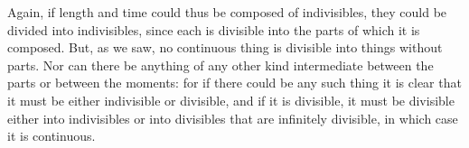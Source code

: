 \documentclass[preview]{standalone}
\begin{document}
\begin{center}
Again, if length and time could thus be composed of indivisibles, they could be divided into indivisibles, since each is divisible into the parts of which it is composed. But, as we saw, no continuous thing is divisible into things without parts. Nor can there be anything of any other kind intermediate between the parts or between the moments: for if there could be any such thing it is clear that it must be either indivisible or divisible, and if it is divisible, it must be divisible either into indivisibles or into divisibles that are infinitely divisible, in which case it is continuous.
\end{center}
\end{document}
